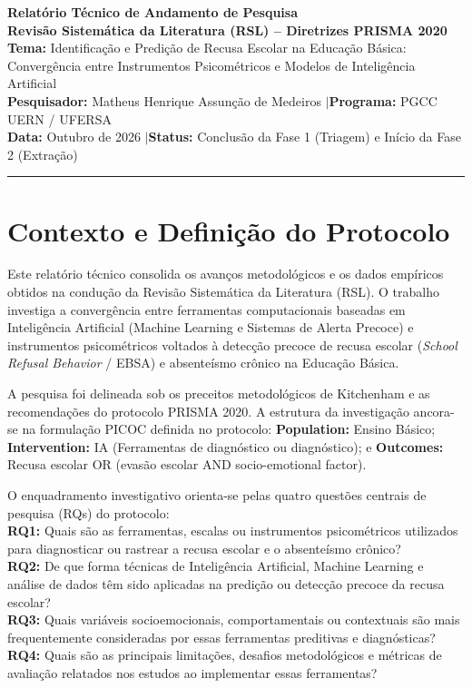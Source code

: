 \documentclass[10pt,a4paper]{article}
\begin{document}
\begin{center}
    {\large \textbf{Relatório Técnico de Andamento de Pesquisa}}\\[2pt]
    {\normalsize \textbf{Revisão Sistemática da Literatura (RSL) -- Diretrizes PRISMA 2020}}\\[3pt]
    \textbf{Tema:} Identificação e Predição de Recusa Escolar na Educação Básica:\\
    Convergência entre Instrumentos Psicométricos e Modelos de Inteligência Artificial\\[3pt]
    \small \textbf{Pesquisador:} Matheus Henrique Assunção de Medeiros \quad$|$\quad \textbf{Programa:} PGCC UERN / UFERSA\\
    \textbf{Data:} Outubro de 2026 \quad$|$\quad \textbf{Status:} Conclusão da Fase 1 (Triagem) e Início da Fase 2 (Extração)
\end{center}

\vspace{-6pt}
\noindent\rule{\textwidth}{0.8pt}
\vspace{-2pt}

\section{Contexto e Definição do Protocolo}
Este relatório técnico consolida os avanços metodológicos e os dados empíricos obtidos na condução da Revisão Sistemática da Literatura (RSL). O trabalho investiga a convergência entre ferramentas computacionais baseadas em Inteligência Artificial (Machine Learning e Sistemas de Alerta Precoce) e instrumentos psicométricos voltados à detecção precoce de recusa escolar (\textit{School Refusal Behavior} / EBSA) e absenteísmo crônico na Educação Básica.


A pesquisa foi delineada sob os preceitos metodológicos de Kitchenham e as recomendações do protocolo PRISMA 2020. A estrutura da investigação ancora-se na formulação PICOC definida no protocolo: \textbf{Population:} Ensino Básico; \textbf{Intervention:} IA (Ferramentas de diagnóstico ou diagnóstico); e \textbf{Outcomes:} Recusa escolar OR (evasão escolar AND socio-emotional factor).

O enquadramento investigativo orienta-se pelas quatro questões centrais de pesquisa (RQs) do protocolo: \\
\textbf{RQ1:} Quais são as ferramentas, escalas ou instrumentos psicométricos utilizados para diagnosticar ou rastrear a recusa escolar e o absenteísmo crônico? \\
\textbf{RQ2:} De que forma técnicas de Inteligência Artificial, Machine Learning e análise de dados têm sido aplicadas na predição ou detecção precoce da recusa escolar? \\
\textbf{RQ3:} Quais variáveis socioemocionais, comportamentais ou contextuais são mais frequentemente consideradas por essas ferramentas preditivas e diagnósticas? \\
\textbf{RQ4:} Quais são as principais limitações, desafios metodológicos e métricas de avaliação relatados nos estudos ao implementar essas ferramentas?
\end{document}
